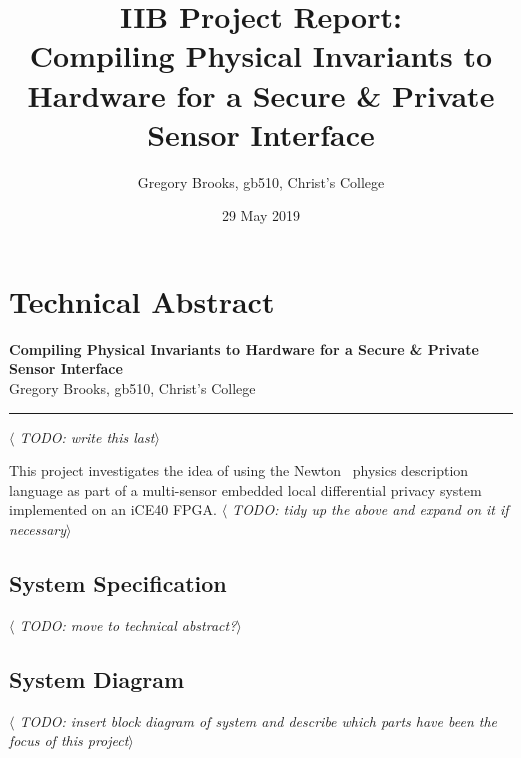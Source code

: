 \documentclass[12pt]{article}
\begin{document}

\clearpage \mbox{}
\clearpage
{}

\noindent

%
%

\title
{
  IIB Project Report:\\
  Compiling Physical Invariants to Hardware for a Secure \& Private Sensor Interface\\
}
\author{Gregory Brooks, gb510, Christ's College}
\date{29 May 2019}
\maketitle

\tableofcontents

\clearpage
{}

%
%
\pagestyle{technical_abstract}
\section{Technical Abstract}

\begin{center}
{
  \bf Compiling Physical Invariants to Hardware for a Secure \& Private Sensor Interface\\
}
Gregory Brooks, gb510, Christ's College
\end{center}
\rule{15.7cm}{0.5mm}
\vspace{1cm}

\textit{$\langle$ TODO: write this last$\rangle$}

This project investigates the idea of using the Newton~\cite{Newton} physics description language as part of a multi-sensor embedded local differential privacy system implemented on an iCE40 FPGA.
\textit{$\langle$ TODO: tidy up the above and expand on it if necessary$\rangle$}

\subsection{System Specification}
  \textit{$\langle$ TODO: move to technical abstract?$\rangle$}


  \subsection{System Diagram}
    \textit{$\langle$ TODO: insert block diagram of system and describe which parts have been the focus of this project$\rangle$}
\end{document}
